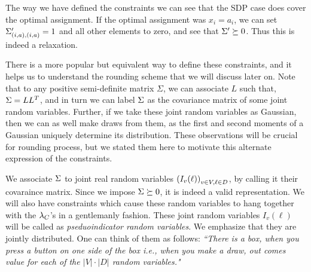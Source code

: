 The way we have defined the constraints we can see that the SDP case does cover the optimal assignment. 
If the optimal assignment was $x_i=a_i$, we can set $ \Sigma'_{\left(i, a\right),\left(i, a\right)} = 1$ and all other elements to zero, and see that $\Sigma' \succeq 0$. 
Thus this is indeed a relaxation.


There is a more popular but equivalent way to define these constraints, and it helps us to understand the rounding scheme that we will discuss later on. 
Note that to any positive semi-definite matrix $\Sigma$, we can associate $L$ such that, $\Sigma = LL^T$, and in turn we can label $\Sigma$ as the covariance matrix of some joint random variables. 
Further, if we take these joint random variables as Gaussian, then we can as well make draws from them, as the first and second moments of a Gaussian  uniquely determine its distribution. 
These observations will be crucial for rounding process, but we stated them here to motivate this alternate expression of the constraints. 

We associate $\Sigma$ to joint real random variables $\left(I_v(\ell)\right)_{v\in V, \ell \in D}$, by calling it their covaraince matrix. Since we impose $\Sigma \succeq 0$, it is indeed a valid representation. 
We will also have constraints which cause these random variables to hang together with the $\lambda_C$'s in a gentlemanly fashion. 
These joint random variables $I_v(\ell)$ will be called as \textit{pseduoindicator random variables}. 
We emphasize that they are jointly distributed. 
One can think of them as follows: 
\textit{``There is a box, when you press a button on one side of the box i.e., when you make a draw, out comes value for each of the $|V| \cdot |D|$ random variables."}

